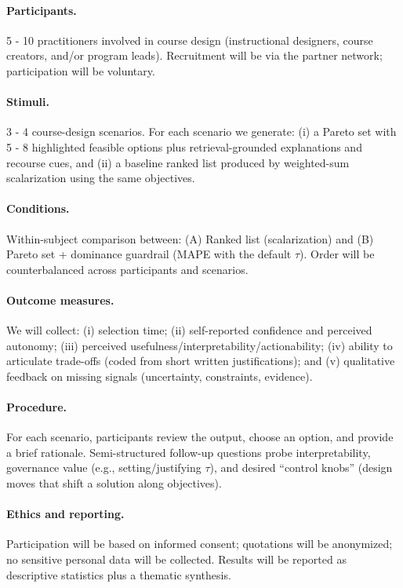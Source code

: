 \documentclass[sigconf,review]{acmart}
\newcommand{\MAPE}{\textsc{MAPE}\xspace}
\begin{document}
\paragraph{Participants.} 5 - 10 practitioners involved in course design (instructional designers, course creators, and/or program leads). Recruitment will be via the partner network; participation will be voluntary.

\paragraph{Stimuli.} 3 - 4 course-design scenarios. For each scenario we generate: (i) a Pareto set with 5 - 8 highlighted feasible options plus retrieval-grounded explanations and recourse cues, and (ii) a baseline ranked list produced by weighted-sum scalarization using the same objectives.

\paragraph{Conditions.} Within-subject comparison between:
(A) {Ranked list (scalarization)} and
(B) {Pareto set + dominance guardrail} (\MAPE with the default $\tau$).
Order will be counterbalanced across participants and scenarios.

\paragraph{Outcome measures.} We will collect:
(i) selection time; (ii) self-reported confidence and perceived autonomy; (iii) perceived usefulness/interpretability/actionability; (iv) ability to articulate trade-offs (coded from short written justifications); and (v) qualitative feedback on missing signals (uncertainty, constraints, evidence).

\paragraph{Procedure.} For each scenario, participants review the output, choose an option, and provide a brief rationale. Semi-structured follow-up questions probe interpretability, governance value (e.g., setting/justifying $\tau$), and desired ``control knobs'' (design moves that shift a solution along objectives).

\paragraph{Ethics and reporting.} Participation will be based on informed consent; quotations will be anonymized; no sensitive personal data will be collected. Results will be reported as descriptive statistics plus a thematic synthesis.
\end{document}
